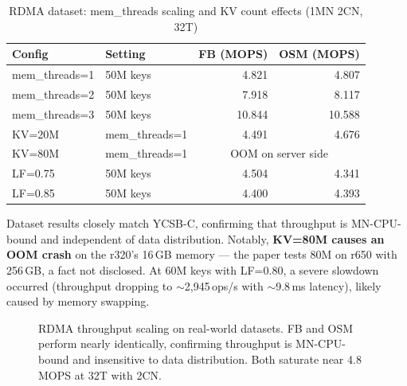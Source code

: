 \documentclass[conference]{IEEEtran}
\begin{document}
\begin{table}[H]
\centering
\caption{RDMA dataset: mem\_threads scaling and KV count effects (1MN 2CN, 32T)}
\label{tab:rdma-dataset-extra}
\small
\begin{tabular}{@{}llrr@{}}
\toprule
\textbf{Config} & \textbf{Setting} & \textbf{FB (MOPS)} & \textbf{OSM (MOPS)} \\
\midrule
mem\_threads=1  & 50M keys & 4.821 & 4.807 \\
mem\_threads=2  & 50M keys & 7.918 & 8.117 \\
mem\_threads=3  & 50M keys & 10.844 & 10.588 \\
\midrule
KV=20M & mem\_threads=1  & 4.491 & 4.676 \\
KV=80M & mem\_threads=1  & \multicolumn{2}{c}{OOM on server side} \\
\midrule
LF=0.75 & 50M keys & 4.504 & 4.341 \\
LF=0.85 & 50M keys & 4.400 & 4.393 \\
\bottomrule
\end{tabular}
\end{table}

Dataset results closely match YCSB-C, confirming that throughput is MN-CPU-bound and independent of data distribution. Notably, \textbf{KV=80M causes an OOM crash} on the r320's 16\,GB memory --- the paper tests 80M on r650 with 256\,GB, a fact not disclosed. At 60M keys with LF=0.80, a severe slowdown occurred (throughput dropping to $\sim$2,945\,ops/s with $\sim$9.8\,ms latency), likely caused by memory swapping.

\begin{figure}[H]
\centering
{}
\caption{RDMA throughput scaling on real-world datasets. FB and OSM perform nearly identically, confirming throughput is MN-CPU-bound and insensitive to data distribution. Both saturate near 4.8\,MOPS at 32T with 2CN.}
\label{fig:rdma-dataset-scaling}
\end{figure}
\end{document}
